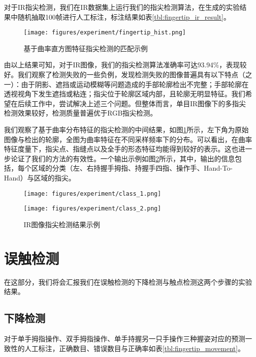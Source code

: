 对于IR指尖检测，我们在IR数据集上运行我们的指尖检测算法，在生成的实验结果中随机抽取100帧进行人工标注，标注结果如表\ref{tbl:fingertip_ir_result}。


\begin{figure}[h]
  \centering
  \texttt{[image: figures/experiment/fingertip\_hist.png]}
  \caption{基于曲率直方图特征指尖检测的匹配示例}
  \label{fig:fingertip_hist}
\end{figure}

由以上结果可知，对于IR图像，我们的指尖检测算法准确率可达93.94\%，表现较好。我们观察了检测失败的一些负例，发现检测失败的图像普遍具有以下特点（之一）：由于阴影、遮挡或运动模糊等问题造成的手部轮廓检出不完整；手部轮廓在透视视角下发生遮挡或粘连；指尖位于轮廓区域内部，且轮廓无明显特征。我们希望在后续工作中，尝试解决上述三个问题。但整体而言，单目IR图像下的多指尖检测效果较好，检测质量普遍优于RGB指尖检测。

我们观察了基于曲率分布特征的指尖检测的中间结果，如图\ref{fig:fingertip_hist}所示，左下角为原始图像与检出的轮廓，全图为曲率特征在不同采样频率下的分布。可以看出，在曲率特征度量下，指尖点、指缝点以及全手的形态特征均能得到较好的表示。这也进一步论证了我们的方法的有效性。一个输出示例如图\ref{fig:ir_example}所示，其中，输出的信息包括，每个区域的分类（左、右持握手拇指、持握手四指、操作手、Hand-To-Hand）与区域的指尖。

\begin{figure}
\begin{minipage}[t]{0.5\linewidth}
\centering
\texttt{[image: figures/experiment/class\_1.png]}
\end{minipage}%
\begin{minipage}[t]{0.5\linewidth}
\centering
\texttt{[image: figures/experiment/class\_2.png]}

\end{minipage}
\caption{IR图像指尖检测结果示例}
\label{fig:ir_example}
\end{figure}


\section{误触检测}
在这部分，我们将会汇报我们在误触检测的下降检测与触点检测这两个步骤的实验结果。

\subsection{下降检测}

对于单手拇指操作、双手拇指操作、单手持握另一只手操作三种握姿对应的预测一致性的人工标注，正确数目、错误数目与正确率如表\ref{tbl:fingertip_movement}。

